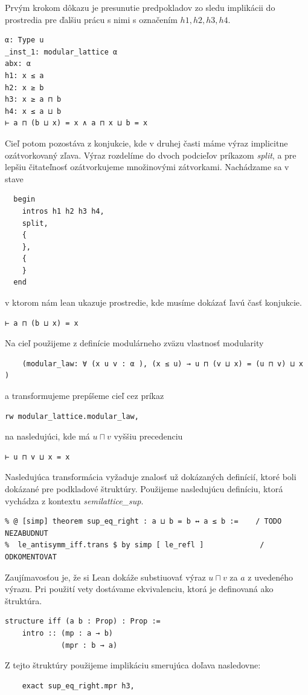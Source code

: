 \documentclass[a4paper,10pt,oneside]{report}%
\begin{document}
    Prvým krokom dôkazu je presunutie predpokladov zo sledu implikácii do
prostredia pre ďalšiu prácu s nimi s označením $h1,h2,h3,h4$.
\begin{lstlisting}
α: Type u
_inst_1: modular_lattice α
abx: α
h1: x ≤ a
h2: x ≥ b
h3: x ≥ a ⊓ b
h4: x ≤ a ⊔ b
⊢ a ⊓ (b ⊔ x) = x ∧ a ⊓ x ⊔ b = x
\end{lstlisting}
    Cieľ potom pozostáva z konjukcie, kde v druhej časti máme výraz implicitne
ozátvorkovaný zľava.
    Výraz rozdelíme do dvoch podcieľov príkazom \emph{split}, a pre lepšiu
čitateľnosť ozátvorkujeme množinovými zátvorkami. Nachádzame sa v stave
\begin{lstlisting}
  begin
    intros h1 h2 h3 h4,
    split,
    {
    },
    {
    }
  end
\end{lstlisting}
v ktorom nám lean ukazuje prostredie, kde musíme dokázať ľavú časť konjukcie.
\begin{lstlisting}
⊢ a ⊓ (b ⊔ x) = x
\end{lstlisting}
Na cieľ použijeme z definície modulárneho zväzu vlastnosť modularity
\begin{lstlisting}
    (modular_law: ∀ (x u v : α ), (x ≤ u) → u ⊓ (v ⊔ x) = (u ⊓ v) ⊔ x )
\end{lstlisting}
a transformujeme prepíšeme cieľ cez príkaz
\begin{lstlisting}
rw modular_lattice.modular_law,
\end{lstlisting}
na nasledujúci, kde má $u \sqcap v$ vyššiu precedenciu
\begin{lstlisting}
⊢ u ⊓ v ⊔ x = x
\end{lstlisting}
    Nasledujúca transformácia vyžaduje znalosť už dokázaných definícií, ktoré
boli dokázané pre podkladové štruktúry. Použijeme nasledujúcu definíciu, ktorá vychádza
z kontextu \emph{semilattice\_sup}.
\begin{lstlisting}
% @ [simp] theorem sup_eq_right : a ⊔ b = b ↔ a ≤ b :=    / TODO NEZABUDNUT
%  le_antisymm_iff.trans $ by simp [ le_refl ]             / ODKOMENTOVAT
\end{lstlisting}
    Zaujímavosťou je, že si Lean dokáže substiuovať výraz $u \sqcap v$ za $a$ z uvedeného
výrazu. Pri použití vety dostávame ekvivalenciu, ktorá je definovaná ako štruktúra.
\begin{lstlisting}
structure iff (a b : Prop) : Prop :=
    intro :: (mp : a → b)
             (mpr : b → a)
\end{lstlisting}
Z tejto štruktúry použijeme implikáciu smerujúca doľava nasledovne:
\begin{lstlisting}
    exact sup_eq_right.mpr h3,
\end{lstlisting}
\end{document}
